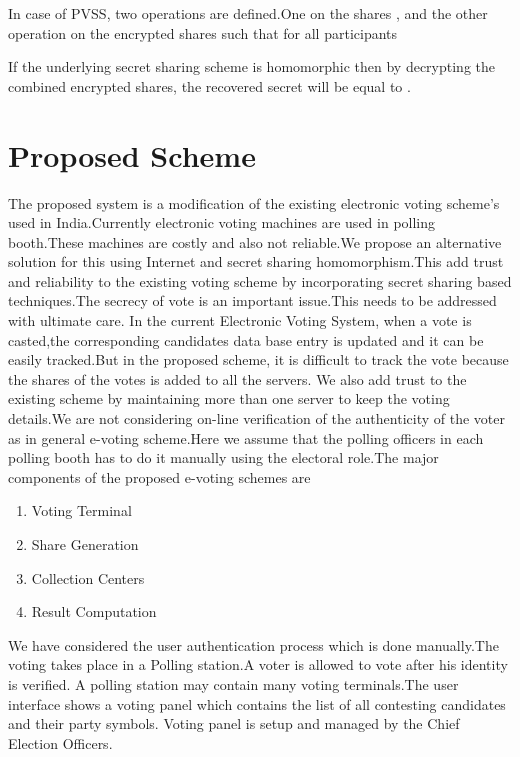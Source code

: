 \documentclass[conference]{IEEEtran}
\begin{document}
In case of PVSS, two operations are defined.One on the shares  , and the other operation  on the encrypted shares such that for all participants

If the underlying secret sharing scheme is homomorphic then by decrypting the combined encrypted shares, the recovered secret will be equal to .

\section{Proposed Scheme}

The proposed system is a modification of the existing electronic voting scheme's used in India.Currently electronic voting machines are used in polling booth.These machines are costly and also not reliable.We propose an alternative solution for this using Internet and secret sharing homomorphism.This add trust and reliability to the existing voting scheme by incorporating secret sharing based techniques.The secrecy of vote is an important issue.This needs to be addressed with ultimate care. In the current Electronic Voting System, when a vote is casted,the corresponding candidates data base entry is updated and it can be easily tracked.But in the proposed scheme, it is difficult to track the vote because the shares of the votes is added to all the servers. We also add trust to the existing scheme by maintaining more than one server to keep the voting details.We are not considering on-line verification of the authenticity of the voter as in general e-voting scheme.Here we assume that the polling officers in each polling booth has to do it manually using the electoral role.The major components of the proposed e-voting schemes are
\begin{enumerate}
	\item Voting Terminal
	\item Share Generation 
	\item Collection Centers
	\item Result Computation
\end{enumerate}

We have considered the user authentication process which is done manually.The voting takes place in a Polling station.A voter is allowed to vote after his identity is verified. A polling station may contain many voting terminals.The user interface shows a voting panel which contains the list of all contesting candidates and their party symbols. Voting panel is setup and managed by the Chief Election Officers.
\end{document}
